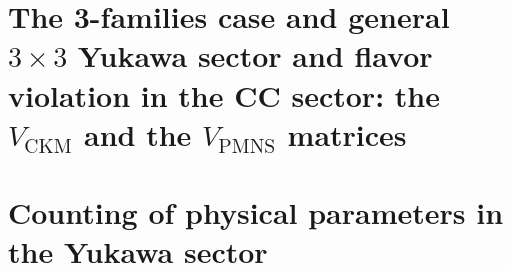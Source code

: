 \documentclass[TheoreticalPhy_ModB.tex]{subfiles}
\begin{document}
\section{The 3-families case and general $3\times3$ Yukawa sector and flavor violation in the CC sector: the $V_{\text{CKM}}$ and the $V_{\text{PMNS}}$ matrices}

\section{Counting of physical parameters in the Yukawa sector}
\end{document}
